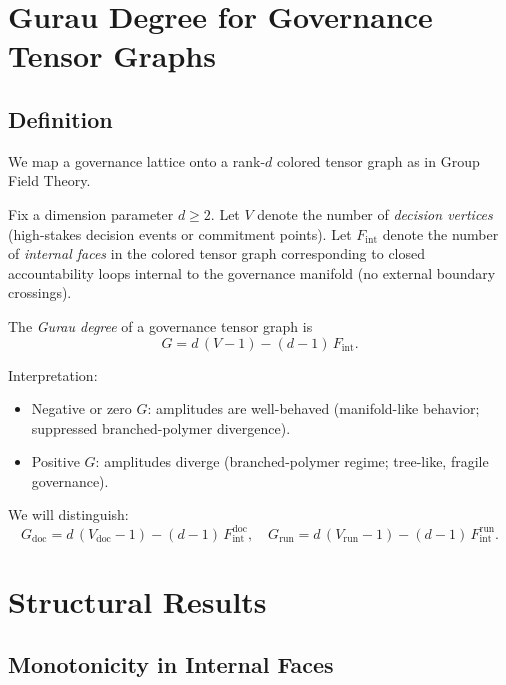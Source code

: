 \documentclass[11pt]{article}
\begin{document}
\section{Gurau Degree for Governance Tensor Graphs}

\subsection{Definition}

We map a governance lattice onto a rank-\(d\) colored tensor graph as in Group Field Theory.

\begin{definition}
Fix a dimension parameter \(d \ge 2\). Let \(V\) denote the number of \emph{decision vertices} (high-stakes decision events or commitment points). Let \(F_{\mathrm{int}}\) denote the number of \emph{internal faces} in the colored tensor graph corresponding to closed accountability loops internal to the governance manifold (no external boundary crossings).
\end{definition}

\begin{definition}
The \emph{Gurau degree} of a governance tensor graph is
\[
G = d\,(V - 1) - (d - 1)\,F_{\mathrm{int}}.
\]
\end{definition}

Interpretation:
\begin{itemize}
  \item Negative or zero \(G\): amplitudes are well-behaved (manifold-like behavior; suppressed branched-polymer divergence).
  \item Positive \(G\): amplitudes diverge (branched-polymer regime; tree-like, fragile governance).
\end{itemize}

We will distinguish:
\[
G_{\mathrm{doc}} = d\,(V_{\mathrm{doc}} - 1) - (d-1)\,F_{\mathrm{int}}^{\mathrm{doc}},\quad
G_{\mathrm{run}} = d\,(V_{\mathrm{run}} - 1) - (d-1)\,F_{\mathrm{int}}^{\mathrm{run}}.
\]

\section{Structural Results}

\subsection{Monotonicity in Internal Faces}
\end{document}
